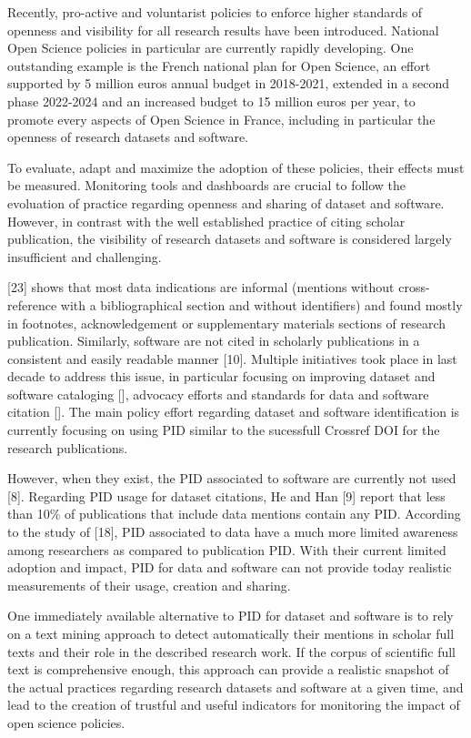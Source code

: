 \documentclass[
]{article}
\begin{document}
Recently, pro-active and voluntarist policies to enforce higher
standards of openness and visibility for all research results have been
introduced. National Open Science policies in particular are currently
rapidly developing. One outstanding example is the French national plan
for Open Science, an effort supported by 5 million euros annual budget
in 2018-2021, extended in a second phase 2022-2024 and an increased
budget to 15 million euros per year, to promote every aspects of Open
Science in France, including in particular the openness of research
datasets and software.

To evaluate, adapt and maximize the adoption of these policies, their
effects must be measured. Monitoring tools and dashboards are crucial to
follow the evoluation of practice regarding openness and sharing of
dataset and software. However, in contrast with the well established
practice of citing scholar publication, the visibility of research
datasets and software is considered largely insufficient and
challenging.

{[}23{]} shows that most data indications are informal (mentions without
cross-reference with a bibliographical section and without identifiers)
and found mostly in footnotes, acknowledgement or supplementary
materials sections of research publication. Similarly, software are not
cited in scholarly publications in a consistent and easily readable
manner {[}10{]}. Multiple initiatives took place in last decade to
address this issue, in particular focusing on improving dataset and
software cataloging {[}{]}, advocacy efforts and standards for data and
software citation {[}{]}. The main policy effort regarding dataset and
software identification is currently focusing on using PID similar to
the sucessfull Crossref DOI for the research publications.

However, when they exist, the PID associated to software are currently
not used {[}8{]}. Regarding PID usage for dataset citations, He and Han
{[}9{]} report that less than 10\% of publications that include data
mentions contain any PID. According to the study of {[}18{]}, PID
associated to data have a much more limited awareness among researchers
as compared to publication PID. With their current limited adoption and
impact, PID for data and software can not provide today realistic
measurements of their usage, creation and sharing.

One immediately available alternative to PID for dataset and software is
to rely on a text mining approach to detect automatically their mentions
in scholar full texts and their role in the described research work. If
the corpus of scientific full text is comprehensive enough, this
approach can provide a realistic snapshot of the actual practices
regarding research datasets and software at a given time, and lead to
the creation of trustful and useful indicators for monitoring the impact
of open science policies.
\end{document}
